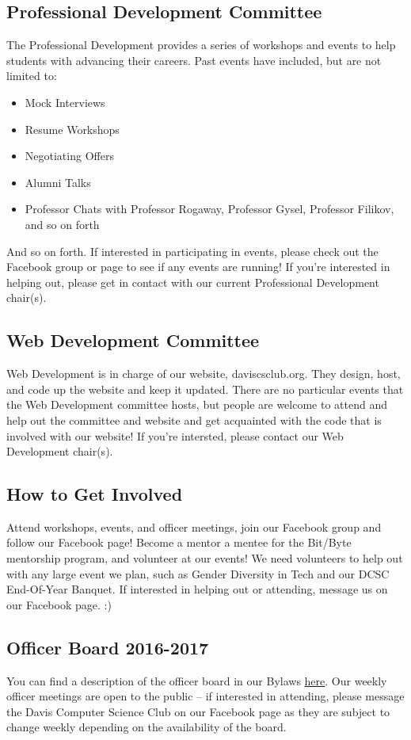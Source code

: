 \documentclass{article}
\begin{document}
\subsection{Professional Development Committee}
The Professional Development provides a series of workshops and events to help
students with advancing their careers. Past events have included, but are not
limited to:
\begin{itemize}
    \item Mock Interviews
    \item Resume Workshops
    \item Negotiating Offers
    \item Alumni Talks 
    \item Professor Chats with Professor Rogaway, Professor Gysel, Professor
      Filikov, and so on forth
\end{itemize}
And so on forth. If interested in participating in events, please check out the
Facebook group or page to see if any events are running! If you're interested in
helping out, please get in contact with our current Professional Development
chair(s).

\subsection{Web Development Committee}
Web Development is in charge of our website, daviscsclub.org. They design, host,
and code up the website and keep it updated. There are no particular events that
the Web Development committee hosts, but people are welcome to attend and help
out the committee and website and get acquainted with the code that is involved
with our website! If you're intersted, please contact our Web Development
chair(s).

\subsection {How to Get Involved}
Attend workshops, events, and officer meetings, join our Facebook group and
follow our Facebook page! Become a mentor a mentee for the Bit/Byte mentorship
program, and volunteer at our events! We need volunteers to help out with any
large event we plan, such as Gender Diversity in Tech and our DCSC End-Of-Year
Banquet. If interested in helping out or attending, message us on our Facebook
page. :)

\subsection{Officer Board 2016-2017}
\label{sec:officers}
You can find a description of the officer board in our Bylaws
\href{https://github.com/DavisCSClub/Bylaws/blob/master/bylaws.pdf}{here}. Our
weekly officer meetings are open to the public -- if interested in attending,
please message the Davis Computer Science Club on our Facebook page as they are
subject to change weekly depending on the availability of the board.
\end{document}
